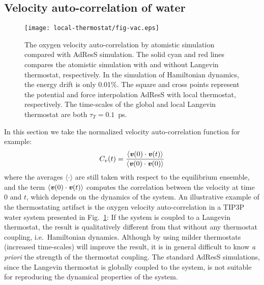\documentclass[epjST]{svjour}
\newcommand{\vect}[1]{\textbf{\textit{#1}}}
\begin{document}


\subsection{Velocity auto-correlation of water}

\begin{figure}
  \centering
  \texttt{[image: local-thermostat/fig-vac.eps]}
  \caption{The oxygen velocity auto-correlation by atomistic
    simulation compared with AdResS simulation.  The solid cyan and
    red lines compares the atomistic simulation with and without
    Langevin thermostat, respectively.
    In the simulation of Hamiltonian dynamics, the energy drift is only 0.01\%.
    The square and cross points
    represent the potential and force interpolation AdResS with local
    thermostat, respectively.  The time-scales of the global and local Langevin
  thermostat are both $\tau_T = 0.1$~ps.}
  \label{fig:vac}
\end{figure}

In this section we take the normalized velocity auto-correlation function
for example:
\begin{align}
  C_v(t) = \frac{\langle \vect v(0)\cdot \vect v(t) \rangle}{\langle \vect v(0)\cdot \vect v(0) \rangle}
\end{align}
where the averages $\langle\cdot\rangle$ are still taken with respect
to the equilibrium ensemble, and the term
$\langle \vect v(0)\cdot \vect v(t)\rangle$ computes the correlation
between the velocity at time $0$ and $t$, which depends on the dynamics of the system. 
An illustrative example of the thermostating artifact is 
the oxygen velocity auto-correlation
in a TIP3P~\cite{jorgensen1983comparison} water system presented in Fig.~\ref{fig:vac}: If the system
is coupled to a Langevin thermostat, the result is qualitatively
different from that without any thermostat coupling, i.e.~Hamiltonian
dynamics. Although by using milder thermostats (increased time-scales)
will improve the result, it is in general difficult to know \emph{a priori}
the strength of the thermostat coupling.
The standard AdResS simulations, since the Langevin thermostat
is globally coupled to the system,  is not suitable for reproducing the dynamical
properties of the system.
\end{document}
